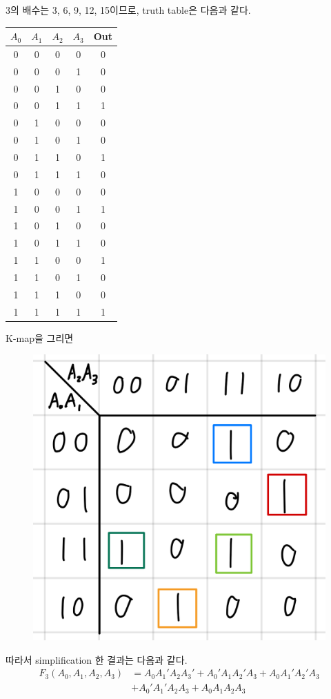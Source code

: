 \documentclass{scrartcl}
\begin{document}
3의 배수는 3, 6, 9, 12, 15이므로, truth table은 다음과 같다.
\begin{table}[H]
  \centering
  \begin{tabular}{|cccc|c|}
    \hline
    \(A_0\) & \(A_1\) & \(A_2\) & \(A_3\) & Out \\
    \hline
    0       & 0       & 0       & 0       & 0   \\
    0       & 0       & 0       & 1       & 0   \\
    0       & 0       & 1       & 0       & 0   \\
    0       & 0       & 1       & 1       & 1   \\
    0       & 1       & 0       & 0       & 0   \\
    0       & 1       & 0       & 1       & 0   \\
    0       & 1       & 1       & 0       & 1   \\
    0       & 1       & 1       & 1       & 0   \\
    1       & 0       & 0       & 0       & 0   \\
    1       & 0       & 0       & 1       & 1   \\
    1       & 0       & 1       & 0       & 0   \\
    1       & 0       & 1       & 1       & 0   \\
    1       & 1       & 0       & 0       & 1   \\
    1       & 1       & 0       & 1       & 0   \\
    1       & 1       & 1       & 0       & 0   \\
    1       & 1       & 1       & 1       & 1   \\
    \hline
  \end{tabular}
\end{table}
K-map을 그리면
\begin{figure}[H]
  \centering
  \includegraphics[width=0.3\linewidth]{lab3_2_3_km}
\end{figure}
따라서 simplification 한 결과는 다음과 같다.
\begin{align*}
  F_3(A_0, A_1, A_2, A_3) &= A_0 A_1' A_2 A_3' + A_0' A_1 A_2' A_3 + A_0 A_1' A_2' A_3 \\
                          &+ A_0' A_1' A_2 A_3 + A_0 A_1 A_2 A_3
\end{align*}
\end{document}
